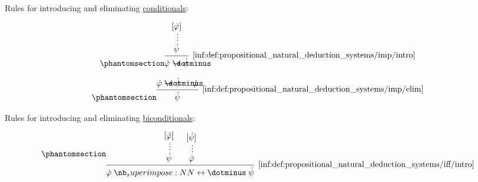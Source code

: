 \begin{definition}
\begin{thmenum}
     Rules for introducing and eliminating \hyperref[def:propositional_alphabet/connectives/conditional]{conditionals}:
    \begin{paracol}{2}
      \begin{leftcolumn}
        \begin{equation*}\taglabel[\ensuremath{ \rightarrow^+ }]{inf:def:propositional_natural_deduction_systems/imp/intro}
          \begin{prooftree}[center=false]
            \hypo{ [\syn\varphi] }
            \ellipsis {} { \syn\psi }
            \infer1[\ref{inf:def:propositional_natural_deduction_systems/imp/intro}]{ \syn\varphi \synimplies \syn\psi }
          \end{prooftree}
        \end{equation*}
      \end{leftcolumn}

      \begin{rightcolumn}
        \begin{equation*}\taglabel[\ensuremath{ \rightarrow^- }]{inf:def:propositional_natural_deduction_systems/imp/elim}
          \begin{prooftree}[center=false]
            \hypo{ \syn\varphi \synimplies \syn\psi }
            \hypo{ \syn\varphi }
            \infer2[\ref{inf:def:propositional_natural_deduction_systems/imp/elim}]{ \syn\psi }
          \end{prooftree}
        \end{equation*}
      \end{rightcolumn}
    \end{paracol}

    \mimprovised Rules for introducing and eliminating \hyperref[def:propositional_alphabet/connectives/biconditional]{biconditionals}:
    \begin{paracol}{3}
      \begin{leftcolumn}
        \begin{equation*}\taglabel[\ensuremath{ \leftrightarrow^+ }]{inf:def:propositional_natural_deduction_systems/iff/intro}
          \begin{prooftree}
            \hypo{ [\syn\varphi] }
            \ellipsis {} { \syn\psi }
            \hypo{ [\syn\psi] }
            \ellipsis {} { \syn\varphi }
            \infer2[\ref{inf:def:propositional_natural_deduction_systems/iff/intro}]{ \syn\varphi \syniff \syn\psi }
          \end{prooftree}
        \end{equation*}
      \end{leftcolumn}


\end{paracol}
\end{thmenum}
\end{definition}
